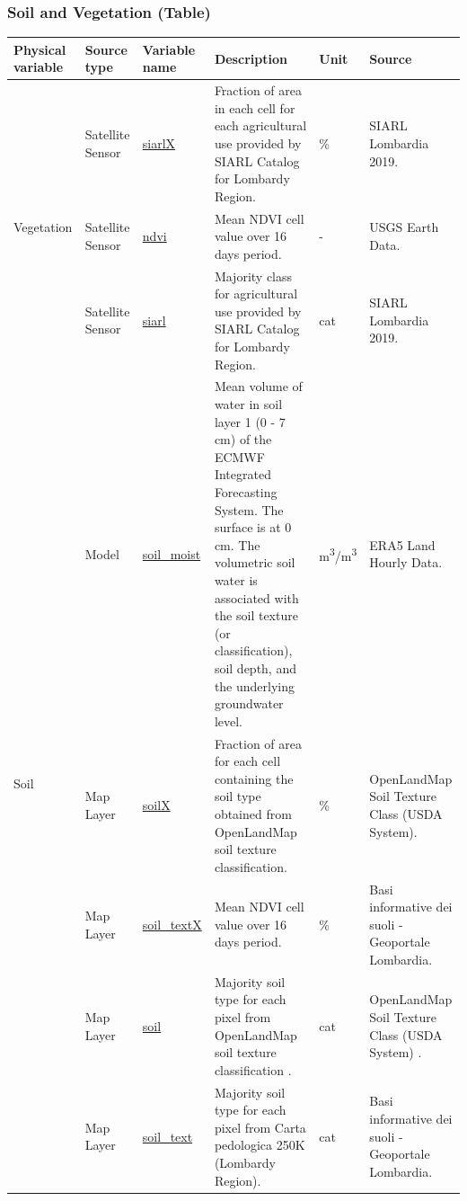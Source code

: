 \subsubsection{Soil and Vegetation (Table)}

\begin{center}
\setlength{\arrayrulewidth}{1.5pt}
\begin{longtable}{ |p{2cm}|p{1.5cm}|p{2.3cm}|p{4cm}|p{1cm}|p{2cm}| } 
\hline
\textbf{Physical variable} & \textbf{Source type}  & \textbf{Variable name}  & \textbf{Description}  & \textbf{Unit}  & \textbf{Source}\\ 
\hline

\multirow{3}{4em}{Vegetation} & Satellite \newline Sensor  & \underline{siarlX} & Fraction of area in each cell for each agricultural use provided by SIARL Catalog for Lombardy Region.\par & \% & SIARL Lombardia 2019.\\ 
& Satellite \newline Sensor  & \underline{ndvi} &  Mean NDVI cell value over 16 days period.\par & - & USGS Earth Data.\\ 
& Satellite \newline Sensor  & \underline{siarl} &  Majority class for agricultural use provided by SIARL Catalog for Lombardy Region. \par & cat & SIARL Lombardia 2019.\\
\hline

\multirow{5}{4em}{Soil} & Model  & \underline{soil\_moist} & Mean volume of water in soil layer 1 (0 - 7 cm) of the ECMWF Integrated Forecasting System. The surface is at 0 cm. The volumetric soil water is associated with the soil texture (or classification), soil depth, and the underlying groundwater level.\par & m\textsuperscript{3}/m\textsuperscript{3} & ERA5 Land Hourly Data.\\ 
& Map Layer  & \underline{soilX} &  Fraction of area for each cell containing the soil type obtained from OpenLandMap soil texture classification.\par & \% & OpenLandMap Soil Texture Class (USDA System).\\ 
& Map Layer  & \underline{soil\_textX} &  Mean NDVI cell value over 16 days period. \par & \% & Basi informative dei suoli - Geoportale Lombardia.\\ 
& Map Layer  & \underline{soil} &  Majority soil type for each pixel from OpenLandMap soil texture classification .\par & cat & OpenLandMap Soil Texture Class (USDA System) .\\ 
& Map Layer  & \underline{soil\_text} &  Majority soil type for each pixel from Carta pedologica 250K (Lombardy Region). \par& cat & Basi informative dei suoli - Geoportale Lombardia.\\ 


\end{longtable}
\end{center}
